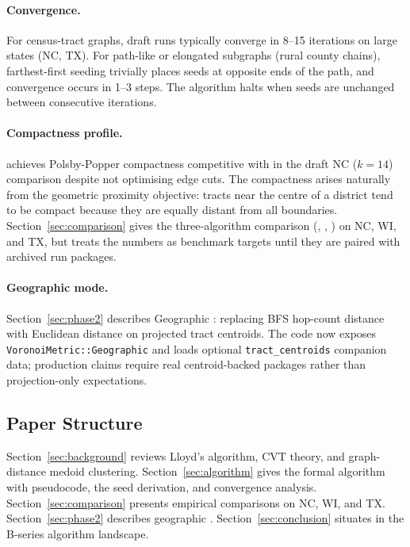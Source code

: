 \paragraph{Convergence.}
For census-tract graphs, draft \cvd{} runs typically converge in 8--15
iterations on large states (NC, TX).
For path-like or elongated subgraphs (rural county chains), farthest-first seeding
trivially places seeds at opposite ends of the path, and convergence occurs in
1--3 steps.
The algorithm halts when seeds are unchanged between consecutive iterations.

\paragraph{Compactness profile.}
\cvd{} achieves Polsby-Popper compactness competitive with \metis{} in the
draft NC ($k=14$) comparison despite not optimising edge cuts.
The compactness arises naturally from the geometric proximity objective: tracts
near the centre of a district tend to be compact because they are equally
distant from all boundaries.
Section~\ref{sec:comparison} gives the three-algorithm comparison
(\cvd{}, \metis{}, \sa{}) on NC, WI, and TX, but treats the numbers as
benchmark targets until they are paired with archived run packages.

\paragraph{Geographic mode.}
Section~\ref{sec:phase2} describes Geographic \cvd{}: replacing BFS hop-count
distance with Euclidean distance on projected tract centroids.
The code now exposes \texttt{VoronoiMetric::Geographic} and loads optional
\texttt{tract\_centroids} companion data; production claims require real
centroid-backed packages rather than projection-only expectations.

\subsection{Paper Structure}

Section~\ref{sec:background} reviews Lloyd's algorithm, CVT theory, and
graph-distance medoid clustering.
Section~\ref{sec:algorithm} gives the formal \cvd{} algorithm with pseudocode,
the seed derivation, and convergence analysis.
Section~\ref{sec:comparison} presents empirical comparisons on NC, WI, and TX.
Section~\ref{sec:phase2} describes geographic \cvd{}.
Section~\ref{sec:conclusion} situates \cvd{} in the B-series algorithm landscape.

